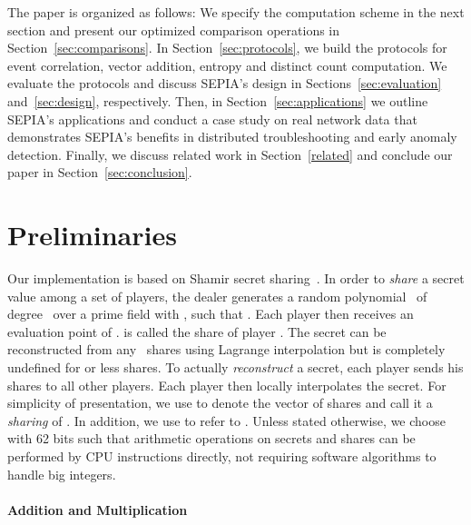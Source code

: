 \documentclass[letterpaper,11pt,onecolumn,titlepage]{article}
\begin{document}
The paper is organized as follows: We specify the computation scheme
in the next section and present our optimized comparison operations in
Section~\ref{sec:comparisons}.  In Section~\ref{sec:protocols}, we
build the protocols for event correlation, vector addition, entropy
and distinct count computation.  We evaluate the protocols and discuss
SEPIA's design in Sections~\ref{sec:evaluation} and~\ref{sec:design},
respectively. Then, in Section~\ref{sec:applications} we outline
SEPIA's applications and conduct a case study on real network data
that demonstrates SEPIA's benefits in distributed troubleshooting and
early anomaly detection. Finally, we discuss related work in
Section~\ref{related} and conclude our paper in
Section~\ref{sec:conclusion}.

\section{Preliminaries}
\label{sec:preliminaries}

Our implementation is based on Shamir secret
sharing~\cite{shamir1979ss}.  In order to \emph{share} a secret value 
among a set of  players, the dealer generates a random
polynomial~ of degree~ over
a prime field  with , such that .  
Each player  then receives an evaluation
point  of .  is called the share of player .
The secret  can be reconstructed from any~
shares using Lagrange interpolation but is completely undefined for
 or less shares. To actually \emph{reconstruct} a secret, each 
player sends his shares to all other players. Each player
then locally interpolates the secret.
For simplicity of presentation, we 
use  to denote the vector of shares  and call it a \emph{sharing} of . 
In addition, we use  to refer to .
Unless stated otherwise, we choose  with 62 bits such that arithmetic operations
on secrets and shares can be performed by CPU instructions directly,
not requiring software algorithms to handle big integers.  

\paragraph{Addition and Multiplication} 
\end{document}
